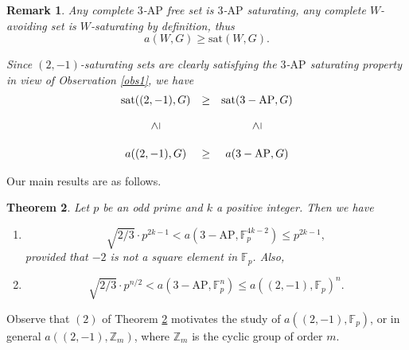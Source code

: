 \documentclass[11pt]{article}
\newcommand{\vgeq}{\mathrel{\rotatebox{90}{$\geq$}}}
\numberwithin{table}{section}
\newcommand{\Z}{{\mathbb Z}}
\newcommand{\F}{{\mathbb F}}
\newcommand{\sat}{\mathrm{sat}}
\newtheorem{theorem}{Theorem}[section]
\newtheorem{remark}[theorem]{Remark}
\theoremstyle{definition}
\begin{document}
	\begin{remark}\label{rem}
		Any  complete $3$-$\mathrm{AP}$ free set is $3$-$\mathrm{AP}$ saturating, any complete $W$-avoiding set is $W$-saturating by definition, thus 
		\[a(W, G)\geq \sat(W, G).\]  %
		
		Since %
		$(2,-1)$-saturating sets are clearly  satisfying the $3$-$\mathrm{AP}$ saturating property in view of Observation \ref{obs1}, we have
		\begin{equation}\label{eq:triv}
			\begin{array}{ccc}
				\sat( (2,-1), G) & \geq & \sat(3-\mathrm{AP}, G)\\
				& & \\
				\vgeq &  & \vgeq\\
				& & \\
				a((2,-1),G) & \geq & a(3-\mathrm{AP}, G)\\
			\end{array}
		\end{equation}
	\end{remark}
	
	\vspace{-0.3cm}
	Our main results are as follows.
	
	
	
	\begin{theorem}\label{main3AP}
		Let $p$ be an odd prime and $k$ a positive integer. Then we have
		\begin{enumerate}[\rm(1)] \vspace{-0.2cm}
			\item 
			\[\sqrt{2/3}\cdot p^{2k-1}<a(3-\mathrm{AP}, \F_p^{4k-2})\leq p^{2k-1},\]  provided that  $-2$ is not a square element  in $\F_p$.  Also, \vspace{-0.2cm}
			\item %
			\[\sqrt{2/3}\cdot p^{n/2}<a(3-\mathrm{AP}, \F_p^{n})\leq a((2,-1),\F_p)^n.\]
		\end{enumerate}
	\end{theorem}
	\vspace{-0.3cm}
	Observe that $(2)$ of Theorem \ref{main3AP} motivates the study of 
	$a((2,-1),\F_p)$, or in general $a((2,-1),\Z_m)$, where $\Z_m$ is the cyclic group of order $m$.
	
\end{document}
